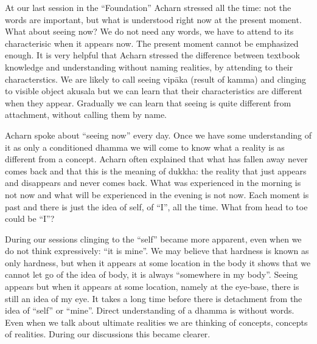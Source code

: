 At our last session in the ``Foundation'' Acharn stressed all the time:
not the words are important, but what is understood right now at the
present moment. What about seeing now? We do not need any words, we have
to attend to its characterisic when it appears now. The present moment
cannot be emphasized enough. It is very helpful that Acharn stressed the
difference between textbook knowledge and understanding without naming
realities, by attending to their characterstics. We are likely to call
seeing vipāka (result of kamma) and clinging to visible object akusala
but we can learn that their characteristics are different when they
appear. Gradually we can learn that seeing is quite different from
attachment, without calling them by name.

Acharn spoke about ``seeing now'' every day. Once we have some
understanding of it as only a conditioned dhamma we will come to know
what a reality is as different from a concept. Acharn often explained
that what has fallen away never comes back and that this is the meaning
of dukkha: the reality that just appears and disappears and never comes
back. What was experienced in the morning is not now and what will be
experienced in the evening is not now. Each moment is past and there is
just the idea of self, of ``I'', all the time. What from head to toe
could be ``I''?

During our sessions clinging to the ``self'' became more apparent, even
when we do not think expressively: ``it is mine''. We may believe that
hardness is known as only hardness, but when it appears at some location
in the body it shows that we cannot let go of the idea of body, it is
always ``somewhere in my body''. Seeing appears but when it appears at
some location, namely at the eye-base, there is still an idea of my eye.
It takes a long time before there is detachment from the idea of
``self'' or ``mine''. Direct understanding of a dhamma is without words.
Even when we talk about ultimate realities we are thinking of concepts,
concepts of realities. During our discussions this became clearer.

